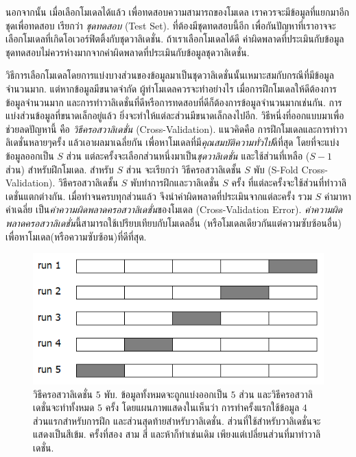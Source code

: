 นอกจากนั้น เมื่อเลือกโมเดลได้แล้ว เพื่อทดสอบความสามารถของโมเดล เราควรจะมีข้อมูลที่แยกมาอีกชุดเพื่อทดสอบ 
เรียกว่า \textit{ชุดทดสอบ} (Test Set).  
ที่ต้องมีชุดทดสอบนี้อีก เพื่อกันปัญหาที่เราอาจจะเลือกโมเดลที่เกิดโอเวอร์ฟิตติ้งกับชุดวาลิเดชั่น.
ถ้าเราเลือกโมเดลได้ดี ค่าผิดพลาดที่ประเมินกับข้อมูลชุดทดสอบไม่ควรห่างมากจากค่าผิดพลาดที่ประเมินกับข้อมูลชุดวาลิเดชั่น.

วิธีการเลือกโมเดลโดยการแบ่งบางส่วนของข้อมูลมาเป็นชุดวาลิเดชั่นนั้นเหมาะสมกับกรณีที่มีข้อมูลจำนวนมาก.
แต่หากข้อมูลมีขนาดจำกัด ผู้ทำโมเดลควรจะทำอย่างไร 
เมื่อการฝึกโมเดลให้ดีต้องการข้อมูลจำนวนมาก
และการทำวาลิเดชั่นที่ดีหรือการทดสอบที่ดีก็ต้องการข้อมูลจำนวนมากเช่นกัน.
การแบ่งส่วนข้อมูลที่ขนาดเล็กอยู่แล้ว ยิ่งจะทำให้แต่ละส่วนมีขนาดเล็กลงไปอีก.
วิธีหนึ่งที่ออกแบบมาเพื่อช่วยลดปัญหานี้ คือ \textit{วิธีครอสวาลิเดชั่น} (Cross-Validation).  
แนวคิดคือ การฝึกโมเดลและการทำวาลิเดชั่นหลายๆครั้ง แล้วเอาผลมาเฉลี่ยกัน เพื่อหาโมเดลที่มี\textit{คุณสมบัติความทั่วไป}ดีที่สุด
โดยที่จะแบ่งข้อมูลออกเป็น $S$ ส่วน 
แต่ละครั้งจะเลือกส่วนหนึ่งมาเป็น\textit{ชุดวาลิเดชั่น}
และใช้ส่วนที่เหลือ ($S-1$ ส่วน) สำหรับฝึกโมเดล.
สำหรับ $S$ ส่วน จะเรียกว่า วิธีครอสวาลิเดชั้น $S$ พับ (S-Fold Cross-Validation).
วิธีครอสวาลิเดชั้น $S$ พับทำการฝึกและวาลิเดชั่น $S$ ครั้ง
ที่แต่ละครั้งจะใช้ส่วนที่ทำวาลิเดชั่นแตกต่างกัน.
เมื่อทำจนครบทุกส่วนแล้ว จึงนำค่าผิดพลาดที่ประเมินจากแต่ละครั้ง รวม $S$ ค่ามาหาค่าเฉลี่ย เป็น\textit{ค่าความผิดพลาดครอสวาลิเดชั่น}ของโมเดล (Cross-Validation Error).
\textit{ค่าความผิดพลาดครอสวาลิเดชั่น}นี้สามารถใช้เปรียบเทียบกับโมเดลอื่น (หรือโมเดลเดียวกันแต่ความซับซ้อนอื่น) เพื่อหาโมเดล(หรือความซับซ้อน)ที่ดีที่สุด.

%
\begin{figure}
\begin{center}
\includegraphics[height=2in]{02Background/crossvalidation.png}
\end{center}
\caption{วิธีครอสวาลิเดชั่น $5$ พับ. 
ข้อมูลทั้งหมดจะถูกแบ่งออกเป็น $5$ ส่วน 
และวิธีครอสวาลิเดชั่นจะทำทั้งหมด $5$ ครั้ง
โดยแผนภาพแสดงในเห็นว่า การทำครั้งแรกใช้ข้อมูล $4$ ส่วนแรกสำหรับการฝึก และส่วนสุดท้ายสำหรับวาลิเดชั่น.
ส่วนที่ใช้สำหรับวาลิเดชั่นจะแสดงเป็นสีเข้ม.
ครั้งที่สอง สาม สี่ และห้าก็ทำเช่นเดิม เพียงแต่เปลี่ยนส่วนที่มาทำวาลิเดชั่น.
}
\label{fig: bg cross validation}
\end{figure}
%

